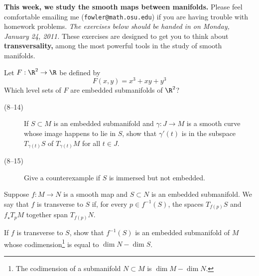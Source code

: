 \documentclass[12pt]{pset}
\author{Jim Fowler}
\date{Winter 2011}
\begin{document}
\maketitle

\noindent\textbf{This week, we study the smooth maps between manifolds.}
Please feel comfortable emailing me (\texttt{fowler@math.osu.edu}) if
you are having trouble with homework problems.  \textit{The exercises
  below should be handed in on Monday, January 24, 2011.}  These
exercises are designed to get you to think about
\textbf{transversality,} among the most powerful tools in the study of
smooth manifolds.

\begin{problem}[Lee 8--2]

Let $F : \R^2 \to \R$ be defined by
$$
F(x,y) = x^3 + xy + y^3
$$
Which level sets of $F$ are embedded submanifolds of $\R^2$?

\end{problem}

\vfill

\begin{problem}

  \begin{description}
    \item[(8--14)]
If $S \subset M$ is an embedded submanifold and $\gamma : J \to M$ is
a smooth curve whose image happens to lie in $S$, show that
$\gamma'(t)$ is in the subspace $T_{\gamma(t)} S$ of $T_{\gamma(t)} M$
for all $t \in J$.
    \item[(8--15)]
Give a counterexample if $S$ is immersed but not embedded.
  \end{description}

\end{problem}

\vfill

\begin{problem}[Lee 8--16]

  Suppose $f : M \to N$ is a smooth map and $S \subset N$ is an
  embedded submanifold.  We say that $f$ is transverse to $S$ if, for
  every $p \in f^{-1}(S)$, the spaces $T_{f(p)} S$ and $f_\star T_p M$
  together span $T_{f(p)} N$.

  If $f$ is transverse to $S$, show that $f^{-1}(S)$ is an embedded
  submanifold of $M$ whose codimension\footnote{The codimension of a
    submanifold $N \subset M$ is $\dim M - \dim N$.} is equal to $\dim
  N - \dim S$.

\end{problem}
\end{document}
